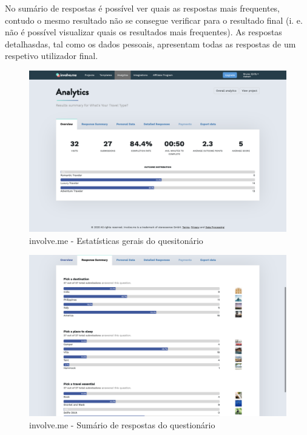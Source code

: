 No sumário de respostas é possível ver quais as respostas mais frequentes, contudo o mesmo resultado não se consegue verificar para o resultado final (i. e. não é possível visualizar quais os resultados mais frequentes). As respostas detalhasdas, tal como os dados pessoais, apresentam todas as respostas de um respetivo utilizador final. 

\newpage

\begin{figure}[ht!]
	\begin{center}
		\includegraphics[width=1\textwidth]{img/ivme/overall1}
		\caption{involve.me - Estatísticas gerais do quesitonário}
		\label{fig:ivme-overall1}
	\end{center}
\end{figure}

\begin{figure}[ht!]
	\begin{center}
		\includegraphics[width=1\textwidth]{img/ivme/results1}
		\caption{involve.me - Sumário de respostas do questionário}
		\label{fig:ivme-results1}
	\end{center}
\end{figure}


